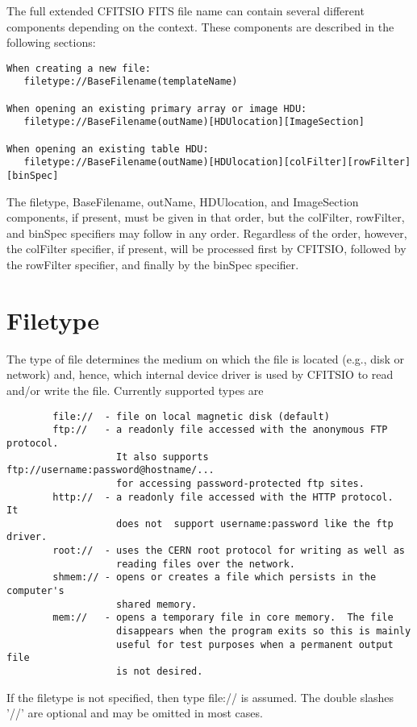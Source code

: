 \documentclass[11pt]{book}
\begin{document}
The full extended CFITSIO FITS file name can contain several different
components depending on the context.  These components are described in
the following sections:

\begin{verbatim}
When creating a new file:
   filetype://BaseFilename(templateName)

When opening an existing primary array or image HDU:
   filetype://BaseFilename(outName)[HDUlocation][ImageSection]

When opening an existing table HDU:
   filetype://BaseFilename(outName)[HDUlocation][colFilter][rowFilter][binSpec]
\end{verbatim}
The filetype, BaseFilename, outName, HDUlocation, and ImageSection
components, if present, must be given in that order, but the colFilter,
rowFilter, and binSpec specifiers may follow in any order.  Regardless
of the order, however, the colFilter specifier, if present, will be
processed first by CFITSIO, followed by the rowFilter specifier, and
finally by the binSpec specifier.


\section{Filetype}

The type of file determines the medium on which the file is located
(e.g., disk or network) and, hence, which internal device driver is used by
CFITSIO to read and/or write the file.  Currently supported types are

\begin{verbatim}
        file://  - file on local magnetic disk (default)
        ftp://   - a readonly file accessed with the anonymous FTP protocol.
                   It also supports  ftp://username:password@hostname/...
                   for accessing password-protected ftp sites.
        http://  - a readonly file accessed with the HTTP protocol.  It
                   does not  support username:password like the ftp driver.
        root://  - uses the CERN root protocol for writing as well as
                   reading files over the network.
        shmem:// - opens or creates a file which persists in the computer's
                   shared memory.
        mem://   - opens a temporary file in core memory.  The file
                   disappears when the program exits so this is mainly
                   useful for test purposes when a permanent output file
                   is not desired.
\end{verbatim}
If the filetype is not specified, then type file:// is assumed.
The double slashes '//' are optional and may be omitted in most cases.
\end{document}
